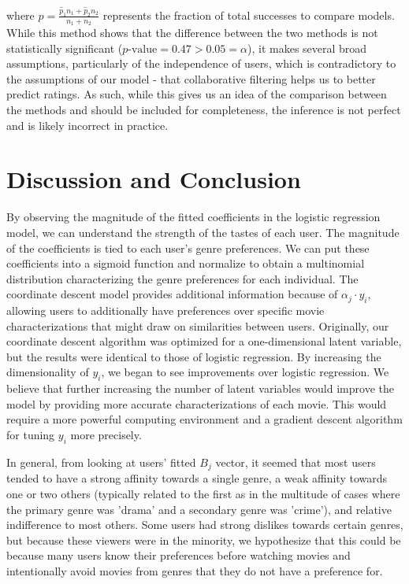 \documentclass{article} %
\begin{document}
where $\hat{p} = \frac{\hat{p}_1 n_1 + \hat{p}_2 n_2}{n_1 + n_2}$ represents the fraction of total successes to compare models. While this method shows that the difference between the two methods is not statistically significant ($p\text{-value} = 0.47 > 0.05 = \alpha$), it makes several broad assumptions, particularly of the independence of users, which is contradictory to the assumptions of our model - that collaborative filtering helps us to better predict ratings. As such, while this gives us an idea of the comparison between the methods and should be included for completeness, the inference is not perfect and is likely incorrect in practice.

\section{Discussion and Conclusion}

By observing the magnitude of the fitted coefficients in the logistic regression model, we can understand the strength of the tastes of each user. The magnitude of the coefficients is tied to each user's genre preferences. We can put these coefficients into a sigmoid function and normalize to obtain a multinomial distribution characterizing the genre preferences for each individual. The coordinate descent model provides additional information because of $\alpha_j \cdot y_i$, allowing users to additionally have preferences over specific movie characterizations that might draw on similarities between users. Originally, our coordinate descent algorithm was optimized for a one-dimensional latent variable, but the results were identical to those of logistic regression. By increasing the dimensionality of $y_i$, we began to see improvements over logistic regression. We believe that further increasing the number of latent variables would improve the model by providing more accurate characterizations of each movie. This would require a more powerful computing environment and a gradient descent algorithm for tuning $y_i$ more precisely.

In general, from looking at users' fitted $B_j$ vector, it seemed that most users tended to have a strong affinity towards a single genre, a weak affinity towards one or two others (typically related to the first as in the multitude of cases where the primary genre was 'drama' and a secondary genre was 'crime'), and relative indifference to most others. Some users had strong dislikes towards certain genres, but because these viewers were in the minority, we hypothesize that this could be because many users know their preferences before watching movies and intentionally avoid movies from genres that they do not have a preference for.
\end{document}
